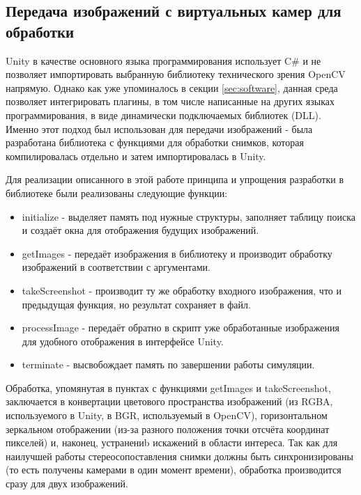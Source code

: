 \subsection{Передача изображений с виртуальных камер для обработки}

Unity в качестве основного языка программирования использует C\# и не позволяет импортировать 
выбранную библиотеку технического зрения OpenCV напрямую. Однако как уже упоминалось в секции 
\ref{sec:software}, данная среда позволяет интегрировать плагины, в том числе написанные на 
других языках программирования, в виде динамически подключаемых библиотек (DLL). Именно этот 
подход был использован для передачи изображений - была разработана библиотека с функциями для 
обработки снимков, которая компилировалась отдельно и затем импортировалась в Unity. 

Для реализации описанного в этой работе принципа и упрощения разработки в библиотеке были реализованы 
следующие функции:
\begin{itemize}
    \item initialize - выделяет память под нужные структуры, заполняет таблицу поиска и создаёт окна 
    для отображения будущих изображений.
    \item getImages - передаёт изображения в библиотеку и производит обработку изображений в 
    соответствии с аргументами. 
    \item takeScreenshot - производит ту же обработку входного изображения, что и предыдущая функция,
     но результат сохраняет в файл. 
    \item processImage - передаёт обратно в скрипт уже обработанные изображения для удобного отображения
    в интерфейсе Unity. 
    \item terminate - высвобождает память по завершении работы симуляции.      
\end{itemize}

Обработка, упомянутая в пунктах с функциями getImages и takeScreenshot, заключается в конвертации 
цветового пространства изображений (из RGBA, используемого в Unity, в BGR, используемый в OpenCV), 
горизонтальном зеркальном отображении (из-за разного положения точки отсчёта координат пикселей)
и, наконец, устранениb искажений в области интереса. Так как для наилучшей работы стереосопоставления
снимки должны быть синхронизированы (то есть получены камерами в один момент времени), обработка        %
производится сразу для двух изображений. 

